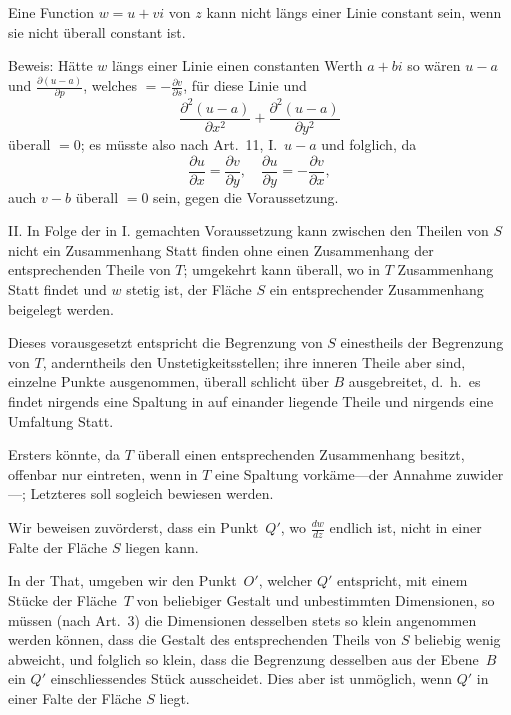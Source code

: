 \documentclass[a4paper,12pt]{article}
\begin{document}
Eine Function $w = u + vi$ von $z$ kann nicht l\"{a}ngs einer
Linie constant sein, wenn sie nicht \"{u}berall constant ist.

Beweis: H\"{a}tte $w$ l\"{a}ngs einer Linie einen constanten
Werth $a + bi$ so w\"{a}ren $u - a$ und
$\displaystyle \frac{\partial (u - a)}{\partial p}$,
welches
$\displaystyle = - \frac{\partial v}{\partial s}$,
f\"{u}r diese Linie und
\[    \frac{\partial^2 (u - a)}{\partial x^2}
    + \frac{\partial^2 (u - a)}{\partial y^2} \]
\"{u}berall $= 0$; es m\"{u}sste also nach Art.~11, I.\ $u - a$
und folglich, da
\[ \frac{\partial u}{\partial x}
      = \frac{\partial v}{\partial y},\quad
   \frac{\partial u}{\partial y}
      = - \frac{\partial v}{\partial x},\]
auch $v - b$ \"{u}berall $= 0$ sein, gegen die Voraussetzung.

II.  In Folge der in I. gemachten Voraussetzung kann zwischen den
Theilen von $S$ nicht ein Zusammenhang Statt finden ohne einen
Zusammenhang der entsprechenden Theile von $T$; umgekehrt kann
\"{u}berall, wo in $T$ Zusammenhang Statt findet und $w$ stetig
ist, der Fl\"{a}che $S$ ein entsprechender Zusammenhang beigelegt
werden.

Dieses vorausgesetzt entspricht die Begrenzung von $S$
einestheils der Begrenzung von $T$, anderntheils den
Unstetigkeitsstellen; ihre inneren Theile aber sind, einzelne
Punkte ausgenommen, \"{u}berall schlicht \"{u}ber $B$
ausgebreitet, d.~h.\ es findet nirgends eine Spaltung in auf
einander liegende Theile und nirgends eine Umfaltung Statt.

Ersters k\"{o}nnte, da $T$ \"{u}berall einen entsprechenden
Zusammenhang besitzt, offenbar nur eintreten, wenn in $T$ eine
Spaltung vork\"{a}me---der Annahme zuwider---; Letzteres soll
sogleich bewiesen werden.

Wir beweisen zuv\"{o}rderst, dass ein Punkt~$Q'$, wo
$\displaystyle \frac{dw}{dz}$
endlich ist, nicht in einer Falte der Fl\"{a}che $S$ liegen kann.

In der That, umgeben wir den Punkt~$O'$, welcher $Q'$ entspricht,
mit einem St\"{u}cke der Fl\"{a}che~$T$ von beliebiger Gestalt
und unbestimmten Dimensionen, so m\"{u}ssen (nach Art.~3) die
Dimensionen desselben stets so klein angenommen werden
k\"{o}nnen, dass die Gestalt des entsprechenden Theils von $S$
beliebig wenig abweicht, und folglich so klein, dass die
Begrenzung desselben aus der Ebene~$B$ ein $Q'$ einschliessendes
St\"{u}ck ausscheidet.  Dies aber ist unm\"{o}glich, wenn $Q'$
in einer Falte der Fl\"{a}che $S$ liegt.
\end{document}

